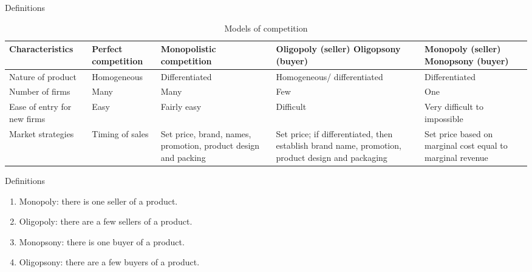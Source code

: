 \documentclass[table,xcolor=pdftex,dvipsnames]{beamer}\usepackage[]{graphicx}\usepackage[]{color}
\begin{document}
\begin{frame}{Definitions}
\begin{table}
\scriptsize
\caption{Models of competition}
\begin{tabular}{l l l l l}
  \toprule
  \parbox[b]{0.75in}{\raggedright Characteristics} & \parbox[b]{0.75in}{\raggedright Perfect competition} & \parbox[b]{0.75in}{\raggedright Monopolistic competition} & \parbox[b]{0.75in}{\raggedright Oligopoly (seller) Oligopsony (buyer)} & \parbox[b]{0.75in}{\raggedright Monopoly (seller) Monopsony (buyer)}\\
  \midrule
  \parbox[c]{0.75in}{\raggedright Nature of product} & \parbox[c]{0.75in}{\raggedright Homogeneous} & \parbox[c]{0.75in}{\raggedright Differentiated} & \parbox[c]{0.75in}{\raggedright Homogeneous/ differentiated} & \parbox[c]{0.75in}{\raggedright Differentiated} \\
  \addlinespace[0.075in]
  \parbox[c]{0.75in}{\raggedright Number of firms} & Many & Many & Few & One \\
  \addlinespace[0.075in]
  \parbox[c]{0.75in}{\raggedright Ease of entry for new firms} & Easy & Fairly easy & Difficult & \parbox[c]{0.75in}{\raggedright Very difficult to impossible} \\
  \addlinespace[0.075in]
  \parbox[c]{0.75in}{\raggedright Market strategies} & \parbox[c]{0.75in}{\raggedright Timing of sales} & \parbox[c]{0.75in}{\raggedright Set price, brand, names, promotion, product design and packing} & \parbox[c]{0.75in}{\raggedright Set price; if differentiated, then establish brand name, promotion, product design and packaging} & \parbox[c]{0.75in}{\raggedright Set price based on marginal cost equal to marginal revenue}\\
  \bottomrule
\end{tabular}
\end{table}
\end{frame}


\begin{frame}{Definitions}
\begin{enumerate}[label=\textbullet]
  \item Monopoly: there is one seller of a product.
  \item Oligopoly: there are a few sellers of a product.
  \item Monopsony: there is one buyer of a product.
  \item Oligopsony: there are a few buyers of a product.
\end{enumerate}
\end{frame}
\end{document}
